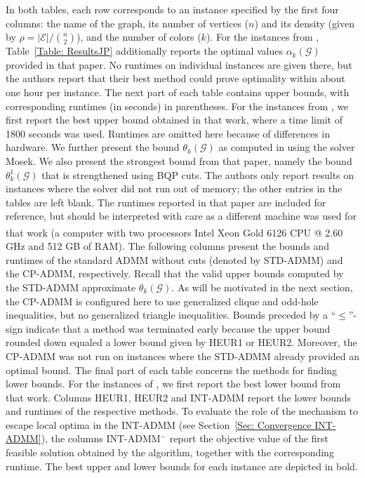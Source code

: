 \documentclass[11pt, a4paper]{article}
\newcommand{\mc}{\mathcal}
\begin{document}
In both tables, each row corresponds to an instance specified by the first four columns: the name of the graph, its number of vertices ($n$) and its density (given by $\rho = |\mc{E}|/\binom{n}{2}$), and the number of colors ($k$).
For the instances from \cite{Januschowski2011ILPSym}, Table~\ref{Table: ResultsJP} additionally reports the optimal values $\alpha_k(\mc{G})$ provided in that paper. 
No runtimes on individual instances are given there, but the authors report that their best method could prove optimality within about  one hour per instance. 
The next part of each table contains upper bounds, with corresponding runtimes (in seconds) in parentheses. 
For the instances from \cite{Campelo2010ILPLagr}, we first report the best upper bound obtained in that work, where a time limit of 1800 seconds was used. 
Runtimes are omitted here because of differences in hardware.
We further present the bound $\theta_k(\mc{G})$ as computed in \cite{Kuryatnikova2022MkCSProblem} using the solver Mosek. We also present the strongest bound from that paper, namely the bound $\theta^1_k(\mc{G})$ that is strengthened using BQP cuts. The authors only report results on instances where the solver did not run out of memory; the other entries in the tables are left blank.
The runtimes reported in that paper are included for reference, but should be interpreted with care as a different machine was used  for that work (a computer with two processors Intel\textsuperscript{\textregistered} Xeon\textsuperscript{\textregistered} Gold 6126 CPU @ 2.60 GHz and 512 GB of RAM).
The following columns present the bounds and runtimes of the standard ADMM without cuts (denoted by STD-ADMM) and the CP-ADMM, respectively.
Recall that the valid upper bounds computed by the STD-ADMM approximate $\theta_k(\mc{G})$.
As will be motivated in the next section, the CP-ADMM is configured here to use generalized clique and odd-hole inequalities, but no generalized triangle inequalities. 
Bounds preceded by a ``$\leq$''-sign indicate that a method was terminated early because the upper bound rounded down equaled a lower bound given by HEUR1 or HEUR2. 
Moreover, the CP-ADMM was not run on instances where the STD-ADMM already provided an optimal bound.
The final part of each table concerns the methods for finding lower bounds.
For the instances of \cite{Campelo2010ILPLagr}, we first report the best lower bound from that work.
Columns HEUR1, HEUR2 and INT-ADMM report the lower bounds and runtimes of the respective methods.
To evaluate the role of the mechanism to escape local optima in the INT-ADMM (see Section~\ref{Sec: Convergence INT-ADMM}), the columns INT-ADMM$^-$ report the objective value of the first feasible solution obtained by the algorithm, together with the corresponding runtime.
The best upper and lower bounds for each instance are depicted in bold.
\end{document}
